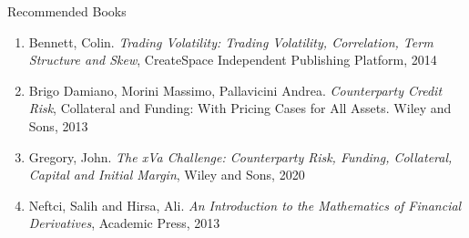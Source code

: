 \documentclass{beamer}
\begin{document}
\begin{frame}{Recommended Books}
	\begin{enumerate}
		\item Bennett, Colin. \textit{Trading Volatility: Trading Volatility, Correlation, Term Structure and Skew}, CreateSpace Independent Publishing Platform, 2014
		\item Brigo Damiano, Morini Massimo, Pallavicini Andrea. \textit{Counterparty Credit Risk}, Collateral and Funding: With Pricing Cases for All Assets. Wiley and Sons, 2013
		\item Gregory, John. \textit{The xVa Challenge: Counterparty Risk, Funding, Collateral, Capital and Initial Margin}, Wiley and Sons, 2020
		\item Neftci, Salih and Hirsa, Ali. \textit{An Introduction to the Mathematics of Financial Derivatives}, Academic Press, 2013
	\end{enumerate}
\end{frame}

\end{document}
